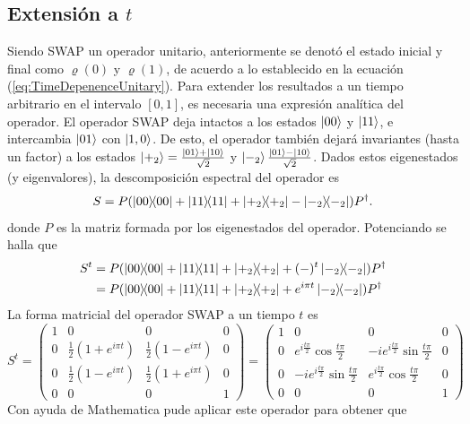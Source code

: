 \subsection{Extensión a $t$}
Siendo \textsc{SWAP} un operador unitario, anteriormente se denotó el estado inicial y final como $\varrho(0)$ y $\varrho(1)$, de acuerdo a lo establecido en la ecuación (\ref{eq:TimeDepenenceUnitary}). Para extender los resultados a un tiempo arbitrario en el intervalo $[0,1]$, es necesaria una expresión analítica del operador. El operador SWAP deja intactos a los estados $\ket{00}$ y $\ket{11}$, e intercambia $\ket{01}$ con $\ket{1,0}$. De esto, el operador también dejará invariantes (hasta un factor) a los estados $\ket{+_{2}}=\frac{\ket{01}+\ket{10}}{\sqrt{2}}$ y $\ket{-_{2}}\frac{\ket{01}-\ket{10}}{\sqrt{2}}$. Dados estos eigenestados (y eigenvalores), la descomposición espectral del operador es
\begin{equation}\label{eq:SWAPSpectral}
S=P(\dyad{00}+\dyad{11}+\dyad{+_{2}}-\dyad{-_{2}})P^{\dag}.
\end{equation}
donde $P$ es la matriz formada por los eigenestados del operador. Potenciando se halla que
\begin{align}\label{eq:SWAPPower}
S^{t}&=P(\dyad{00}+\dyad{11}+\dyad{+_{2}}+(-)^{t}\dyad{-_{2}})P^{\dag}\\
&=P(\dyad{00}+\dyad{11}+\dyad{+_{2}}+e^{i \pi t}\dyad{-_{2}})P^{\dag}
\end{align}
La forma matricial del operador \textsc{SWAP} a un tiempo $t$ es
\begin{equation}
S^{t}=\begin{pmatrix}
 1 & 0 & 0 & 0 \\
 0 & \frac{1}{2}(1+e^{i \pi t}) & \frac{1}{2} (1-e^{i \pi t}) & 0 \\
 0 & \frac{1}{2}(1-e^{i \pi t}) & \frac{1}{2}(1+e^{i \pi t}) & 0 \\
 0 & 0 & 0 & 1
\end{pmatrix}=\begin{pmatrix}
  1 & 0 & 0 & 0 \\
  0 & e^{i\frac{t\pi}{2}}\cos{\frac{t\pi}{2}} & -ie^{i\frac{t\pi}{2}}\sin{\frac{t\pi}{2}} & 0 \\
  0 & -ie^{i\frac{t\pi}{2}}\sin{\frac{t\pi}{2}} & e^{i\frac{t\pi}{2}}\cos{\frac{t\pi}{2}}  & 0 \\
  0 & 0 & 0 & 1
 \end{pmatrix}
\end{equation}
Con ayuda de Mathematica pude aplicar este operador para obtener que
